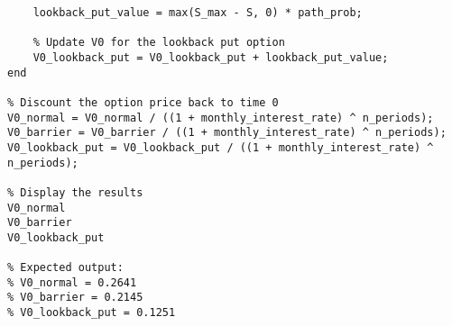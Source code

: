 \documentclass[12pt]{article}
\begin{document}
\begin{lstlisting}[label=lst:code,
    caption=Complete MATLAB Code]
    % Calculate the lookback put option value for this path
    lookback_put_value = max(S_max - S, 0) * path_prob;
    
    % Update V0 for the lookback put option
    V0_lookback_put = V0_lookback_put + lookback_put_value;
end

% Discount the option price back to time 0
V0_normal = V0_normal / ((1 + monthly_interest_rate) ^ n_periods);
V0_barrier = V0_barrier / ((1 + monthly_interest_rate) ^ n_periods);
V0_lookback_put = V0_lookback_put / ((1 + monthly_interest_rate) ^ n_periods);

% Display the results
V0_normal
V0_barrier
V0_lookback_put

% Expected output:
% V0_normal = 0.2641
% V0_barrier = 0.2145
% V0_lookback_put = 0.1251
  
\end{lstlisting}
\end{document}
